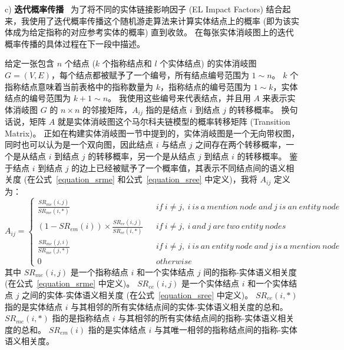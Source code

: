 c) \textbf{迭代概率传播} \ 
为了将不同的实体链接影响因子 (EL Impact Factors) 结合起来，我使用了迭代概率传播这个随机游走算法来计算实体结点上的概率 (即为该实体成为给定指称的对应参考实体的概率) 直到收敛。
在每张实体消岐图上的迭代概率传播的具体过程在下一段中描述。\par

给定一张包含 $n$ 个结点 ($k$ 个指称结点和 $l$ 个实体结点) 的实体消岐图 $G=(V,E)$，每个结点都被赋予了一个编号，所有结点编号范围为 $1 \sim n$。
$k$ 个指称结点意味着当前表格中的指称数量为 $k$，指称结点的编号范围为 $1 \sim k$，实体结点的编号范围为 $k+1 \sim n$。
我使用这些编号来代表结点，并且用 $A$ 来表示实体消岐图 $G$ 的 $n \times n$ 的邻接矩阵，$A_{ij}$ 指的是结点 $i$ 到结点 $j$ 的转移概率。
换句话说，矩阵 $A$ 就是实体消岐图这个马尔科夫链模型的概率转移矩阵 (Transition Matrix)。
正如在构建实体消岐图一节中提到的，实体消岐图是一个无向带权图，同时也可以认为是一个双向图，因此结点 $i$ 与结点 $j$ 之间存在两个转移概率，一个是从结点 $i$ 到结点 $j$ 的转移概率，另一个是从结点 $j$ 到结点 $i$ 的转移概率。
鉴于结点 $i$ 到结点 $j$ 的边上已经被赋予了一个概率值，其表示不同结点间的语义相关度 (在公式~\ref{equation_srme} 和公式~\ref{equation_sree} 中定义)，我将 $A_{ij}$ 定义为：
\begin{equation}
A_{ij}=\left\{
\begin{array}{rcl}
\frac{SR_{me}(i,j)}{SR_{me}(i,*)} && {if \ i \neq j,\ i\ is\ a\ mention\ node\ and\ j\ is\ an\ entity\ node}\\
(1-SR_{em}(i)) \times \frac{SR_{ee}(i,j)}{SR_{ee}(i,*)} && {if\ i \neq j,\ i\ and\ j\ are\ two\ entity\ nodes}\\
\frac{SR_{me}(j,i)}{SR_{me}(j,*)} && {if \ i \neq j,\ i\ is\ an\ entity\ node\ and\ j\ is\ a\ mention\ node}\\
0 && {otherwise}
\end{array} \right.
\label{aij}
\end{equation}
其中 $SR_{me}(i, j)$ 是一个指称结点 $i$ 和一个实体结点 $j$ 间的指称-实体语义相关度 (在公式~\ref{equation_srme} 中定义)。
$SR_{ee}(i, j)$ 是一个实体结点 $i$ 和一个实体结点 $j$ 之间的实体-实体语义相关度 (在公式~\ref{equation_sree} 中定义)。
$SR_{ee}(i, \ast)$ 指的是实体结点 $i$ 与其相邻的所有实体结点间的实体-实体语义相关度的总和。
$SR_{me}(i, \ast)$ 指的是指称结点 $i$ 与其相邻的所有实体结点间的指称-实体语义相关度的总和。
$SR_{em}(i)$ 指的是实体结点 $i$ 与其唯一相邻的指称结点间的指称-实体语义相关度。\par

